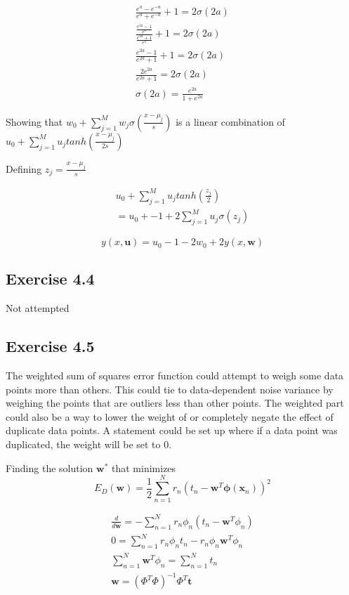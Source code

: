 \begin{gather}
  \frac{e^a-e^{-a}}{e^a+e^{-a}} +1 = 2\sigma(2a) \\
  \frac{\frac{e^{2a} -1}{e^a} }{\frac{e^{2a} +1}{e^a}} +1 =2\sigma(2a) \\
  \frac{e^{2a}-1}{e^{2a}+1} + 1 = 2\sigma(2a) \\
  \frac{2e^{2a}}{e^{2a}+1} = 2\sigma(2a) \\
  \sigma(2a) = \frac{e^{2a}}{1+e^{2a}}
\end{gather}


Showing that $w_0 + \sum_{j=1}^{M}w_j\sigma(\frac{x-\mu_j}{s}) $ is a linear combination of $ u_0 + \sum_{j=1}^{M}u_j tanh(\frac{x-\mu_j}{2s})$

Defining $z_j = \frac{x-\mu_j}{s}$

\begin{gather}
  u_0 + \sum_{j=1}^{M}u_j tanh(\frac{z_j}{2}) \\ 
  = u_0 + -1 + 2\sum_{j=1}^{M}u_j \sigma(z_j)
\end{gather}

\begin{equation}
  y(x,\mathbf{u}) = u_0 -1 -2w_0 + 2y(x,\mathbf{w}) 
\end{equation}


\subsection{Exercise 4.4}
Not attempted

\subsection{Exercise 4.5}
The weighted sum of squares error function could attempt to weigh some data points more than others. This could tie to data-dependent noise variance by weighing the points that are outliers less than other points. The weighted part could also be a way to lower the weight of or completely negate the effect of duplicate data points. A statement could be set up where if a data point was duplicated, the weight will be set to 0.

Finding the solution $\mathbf{w^*}$ that minimizes 
\begin{equation}
  E_D(\mathbf{w}) = \frac{1}{2}\sum_{n=1}^{N}r_n(t_n - \mathbf{w}^T \mathbf{\phi}(\mathbf{x}_n))^2
\end{equation}

\begin{gather}
  \frac{d}{d\mathbf{w}} = -\sum_{n=1}^N r_n \phi_n (t_n-\mathbf{w}^T \phi_n) \\
  0 = \sum_{n=1}^{N} r_n \phi_n t_n - r_n \phi_n \mathbf{w}^T \phi_n \\
  \sum_{n=1}^{N} \mathbf{w}^T \phi_n =\sum_{n=1}^{N} t_n \\
  \mathbf{w} = (\Phi^T\Phi)^{-1}\Phi^T \mathbf{t}
\end{gather}
